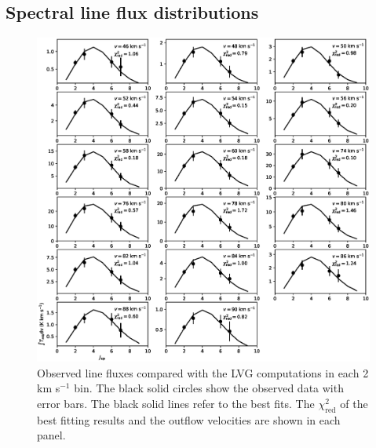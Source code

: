 \documentclass[twocolumn]{aastex62}
\begin{document}
\begin{CJK*}{UTF8}{gbsn}
\section{Spectral line flux distributions}
\begin{figure}[htbp]
\addtocounter{figure}{1}
\includegraphics[scale=.60]{./fig/SED.eps}
\caption{Observed line fluxes compared with the LVG computations in each 2 km s$^{-1}$ bin. The black solid circles show the observed data with error bars. The black solid lines refer to the best fits.  The $\chi^2_{\mathrm{red}}$ of the best fitting results and the outflow velocities are shown in each panel. \label{fig:figsed}}
\end{figure}

\end{CJK*}
\end{document}
